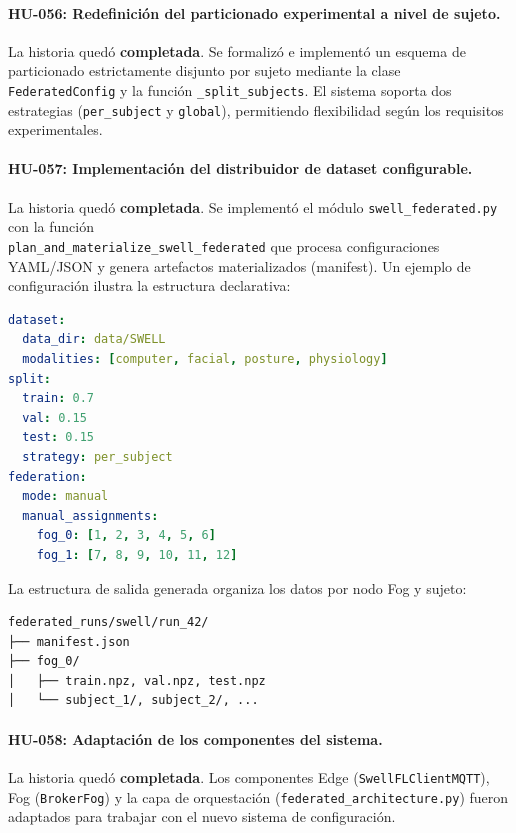 \documentclass{report}
\begin{document}
\paragraph{HU-056: Redefinición del particionado experimental a nivel de sujeto.}
La historia quedó \textbf{completada}. Se formalizó e implementó un esquema de particionado estrictamente disjunto por sujeto mediante la clase \texttt{FederatedConfig} y la función \texttt{\_split\_subjects}. El sistema soporta dos estrategias (\texttt{per\_subject} y \texttt{global}), permitiendo flexibilidad según los requisitos experimentales.


\vspace{0.15em}
\paragraph{HU-057: Implementación del distribuidor de dataset configurable.}
La historia quedó \textbf{completada}. Se implementó el módulo \texttt{swell\_federated.py} con la función \\ \texttt{plan\_and\_materialize\_swell\_federated} que procesa configuraciones YAML/JSON y genera artefactos materializados (manifest). Un ejemplo de configuración ilustra la estructura declarativa:

\begin{lstlisting}[language=yaml, basicstyle=\scriptsize\ttfamily]
dataset:
  data_dir: data/SWELL
  modalities: [computer, facial, posture, physiology]
split:
  train: 0.7
  val: 0.15
  test: 0.15
  strategy: per_subject
federation:
  mode: manual
  manual_assignments:
    fog_0: [1, 2, 3, 4, 5, 6]
    fog_1: [7, 8, 9, 10, 11, 12]
\end{lstlisting}

La estructura de salida generada organiza los datos por nodo Fog y sujeto:
\begin{verbatim}
federated_runs/swell/run_42/
├── manifest.json
├── fog_0/
│   ├── train.npz, val.npz, test.npz
│   └── subject_1/, subject_2/, ...
\end{verbatim}


\vspace{0.15em}
\paragraph{HU-058: Adaptación de los componentes del sistema.}
La historia quedó \textbf{completada}. Los componentes Edge (\texttt{SwellFLClientMQTT}), Fog (\texttt{BrokerFog}) y la capa de orquestación (\texttt{federated\_architecture.py}) fueron adaptados para trabajar con el nuevo sistema de configuración.
\end{document}
